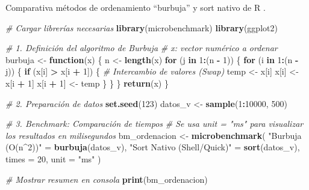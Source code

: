 \documentclass[runningheads]{llncs}
\newenvironment{Shaded}{\begin{snugshade}}{\end{snugshade}}
\newcommand{\AttributeTok}[1]{\textcolor[rgb]{0.13,0.29,0.53}{#1}}
\newcommand{\CommentTok}[1]{\textcolor[rgb]{0.56,0.35,0.01}{\textit{#1}}}
\newcommand{\ControlFlowTok}[1]{\textcolor[rgb]{0.13,0.29,0.53}{\textbf{#1}}}
\newcommand{\DecValTok}[1]{\textcolor[rgb]{0.00,0.00,0.81}{#1}}
\newcommand{\FunctionTok}[1]{\textcolor[rgb]{0.13,0.29,0.53}{\textbf{#1}}}
\newcommand{\NormalTok}[1]{#1}
\newcommand{\OtherTok}[1]{\textcolor[rgb]{0.56,0.35,0.01}{#1}}
\newcommand{\SpecialCharTok}[1]{\textcolor[rgb]{0.81,0.36,0.00}{\textbf{#1}}}
\newcommand{\StringTok}[1]{\textcolor[rgb]{0.31,0.60,0.02}{#1}}
\begin{document}
Comparativa métodos de ordenamiento ``burbuja'' y sort nativo de R .

\begin{Shaded}
\begin{Highlighting}[]
\CommentTok{\# Cargar librerías necesarias}
\FunctionTok{library}\NormalTok{(microbenchmark)}
\FunctionTok{library}\NormalTok{(ggplot2)}

\CommentTok{\# 1. Definición del algoritmo de Burbuja}
\CommentTok{\# x: vector numérico a ordenar}
\NormalTok{burbuja }\OtherTok{\textless{}{-}} \ControlFlowTok{function}\NormalTok{(x) \{}
\NormalTok{  n }\OtherTok{\textless{}{-}} \FunctionTok{length}\NormalTok{(x)}
  \ControlFlowTok{for}\NormalTok{ (j }\ControlFlowTok{in} \DecValTok{1}\SpecialCharTok{:}\NormalTok{(n }\SpecialCharTok{{-}} \DecValTok{1}\NormalTok{)) \{}
    \ControlFlowTok{for}\NormalTok{ (i }\ControlFlowTok{in} \DecValTok{1}\SpecialCharTok{:}\NormalTok{(n }\SpecialCharTok{{-}}\NormalTok{ j)) \{}
      \ControlFlowTok{if}\NormalTok{ (x[i] }\SpecialCharTok{\textgreater{}}\NormalTok{ x[i }\SpecialCharTok{+} \DecValTok{1}\NormalTok{]) \{}
        \CommentTok{\# Intercambio de valores (Swap)}
\NormalTok{        temp }\OtherTok{\textless{}{-}}\NormalTok{ x[i]}
\NormalTok{        x[i] }\OtherTok{\textless{}{-}}\NormalTok{ x[i }\SpecialCharTok{+} \DecValTok{1}\NormalTok{]}
\NormalTok{        x[i }\SpecialCharTok{+} \DecValTok{1}\NormalTok{] }\OtherTok{\textless{}{-}}\NormalTok{ temp}
\NormalTok{      \}}
\NormalTok{    \}}
\NormalTok{  \}}
  \FunctionTok{return}\NormalTok{(x)}
\NormalTok{\}}

\CommentTok{\# 2. Preparación de datos}
\FunctionTok{set.seed}\NormalTok{(}\DecValTok{123}\NormalTok{)}
\NormalTok{datos\_v }\OtherTok{\textless{}{-}} \FunctionTok{sample}\NormalTok{(}\DecValTok{1}\SpecialCharTok{:}\DecValTok{10000}\NormalTok{, }\DecValTok{500}\NormalTok{)}

\CommentTok{\# 3. Benchmark: Comparación de tiempos}
\CommentTok{\# Se usa unit = "ms" para visualizar los resultados en milisegundos}
\NormalTok{bm\_ordenacion }\OtherTok{\textless{}{-}} \FunctionTok{microbenchmark}\NormalTok{(}
  \StringTok{"Burbuja (O(n\^{}2))"} \OtherTok{=} \FunctionTok{burbuja}\NormalTok{(datos\_v),}
  \StringTok{"Sort Nativo (Shell/Quick)"} \OtherTok{=} \FunctionTok{sort}\NormalTok{(datos\_v),}
  \AttributeTok{times =} \DecValTok{20}\NormalTok{,}
  \AttributeTok{unit =} \StringTok{"ms"}
\NormalTok{)}

\CommentTok{\# Mostrar resumen en consola}
\FunctionTok{print}\NormalTok{(bm\_ordenacion)}
\end{Highlighting}
\end{Shaded}
\end{document}
